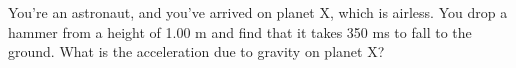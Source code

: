 %
You're an astronaut, and you've arrived on planet X, which is airless. You drop a
hammer from a height of 1.00 m and find that it takes 350
ms to fall to the ground. What is the acceleration due to
gravity on planet X?\answercheck
